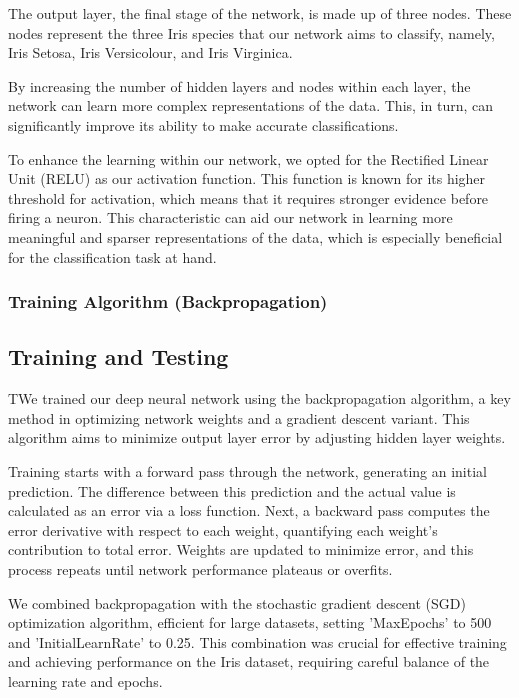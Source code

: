 \documentclass[conference]{inc/IEEEtran}
\begin{document}
The output layer, the final stage of the network, is made up of three nodes. These nodes represent the three Iris species that our network aims to classify, namely, Iris Setosa, Iris Versicolour, and Iris Virginica.

By increasing the number of hidden layers and nodes within each layer, the network can learn more complex representations of the data. This, in turn, can significantly improve its ability to make accurate classifications. 

To enhance the learning within our network, we opted for the Rectified Linear Unit (RELU) as our activation function. This function is known for its higher threshold for activation, which means that it requires stronger evidence before firing a neuron. This characteristic can aid our network in learning more meaningful and sparser representations of the data, which is especially beneficial for the classification task at hand.

\subsubsection{Training Algorithm (Backpropagation)}

\subsection{Training and Testing}

TWe trained our deep neural network using the backpropagation algorithm, a key method in optimizing network weights and a gradient descent variant. This algorithm aims to minimize output layer error by adjusting hidden layer weights.

Training starts with a forward pass through the network, generating an initial prediction. The difference between this prediction and the actual value is calculated as an error via a loss function. Next, a backward pass computes the error derivative with respect to each weight, quantifying each weight's contribution to total error. Weights are updated to minimize error, and this process repeats until network performance plateaus or overfits.

We combined backpropagation with the stochastic gradient descent (SGD) optimization algorithm, efficient for large datasets, setting 'MaxEpochs' to 500 and 'InitialLearnRate' to 0.25. This combination was crucial for effective training and achieving performance on the Iris dataset, requiring careful balance of the learning rate and epochs.
\end{document}
